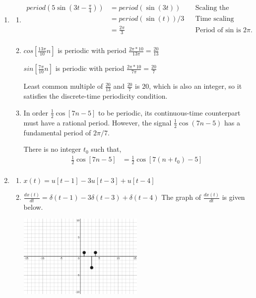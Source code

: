 \documentclass[10pt,a4paper, margin=1in]{article}
\begin{document}
\begin{enumerate}
\begin{enumerate}
    
    \end{enumerate}

\item %
    \begin{enumerate}
    \item \begin{align*}
        period(5\sin(3t - \frac{\pi}{4})) & = period(\sin(3t)) && \text{Scaling the amplitude does not affect the period, neither does shifting.} \\
        & = period(\sin(t)) / 3 && \text{Time scaling inversely affects the period.} \\
        & = \frac{2\pi}{3} && \text{Period of sin is } 2\pi. \\
    \end{align*}    
    \item $cos[\frac{13\pi}{10}n]$ is periodic with period $\frac{2\pi*10}{13\pi} = \frac{20}{13}$
    
    $sin[\frac{7\pi}{10}n]$ is periodic with period $\frac{2\pi*10}{7\pi} = \frac{20}{7}$

    Least common multiple of $\frac{20}{13}$ and $\frac{20}{7}$ is $20$, which is also an integer, so it satisfies the discrete-time periodicity condition.

	\item In order $\frac{1}{2}\cos[7n - 5]$ to be periodic, its continuous-time counterpart must have a rational period.
    However, the signal $\frac{1}{2}\cos(7n - 5)$ has a fundamental period of $2\pi/7$.

    There is no integer $t_0$ such that,
    \begin{align*}
        \frac{1}{2}\cos[7n - 5] & = \frac{1}{2}\cos[7(n + t_0) - 5] \\
    \end{align*}
    \end{enumerate}

\item %
    \begin{enumerate}
    \item $x(t) = u[t-1] - 3u[t-3] + u[t-4]$
    \item $\frac{dx(t)}{dt} = \delta(t-1) -3\delta(t-3) +\delta(t-4)$
        The graph of $\frac{dx(t)}{dt}$ is given below.
        \begin{center}
            \includegraphics*[width=0.5\textwidth]{assets/graphs/q5b.png}
        \end{center}
    \end{enumerate}    
    

\end{enumerate}
\end{document}
